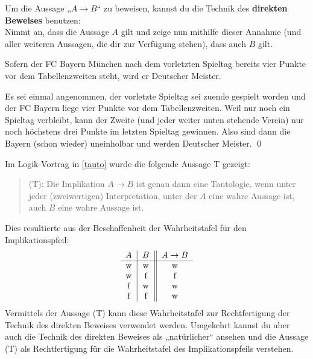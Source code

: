  
 
 \begin{axi} \label{direkterbeweis}
  Um die Aussage „$A\to B$“ zu beweisen, kannst du die Technik des \textbf{direkten Beweises} benutzen: \\
  Nimmt an, dass die Aussage $A$ gilt und zeige nun mithilfe dieser Annahme (und aller weiteren Aussagen, die dir zur Verfügung stehen), dass auch $B$ gilt. %
  \end{axi}
  \begin{bsp}
 Sofern der FC Bayern München nach dem vorletzten Spieltag bereits vier Punkte vor dem Tabellenzweiten steht, wird er Deutscher Meister.
 \end{bsp}
 \begin{bew}
Es sei einmal angenommen, der vorletzte Spieltag sei zuende gespielt worden und der FC Bayern liege vier Punkte vor dem Tabellenzweiten. Weil nur noch ein Spieltag verbleibt, kann der Zweite (und jeder weiter unten stehende Verein) nur noch höchstens drei Punkte im letzten Spieltag gewinnen. Also sind dann die Bayern (schon wieder) uneinholbar und werden Deutscher Meister. \qed
  \end{bew}
  
  \begin{bem}
 Im Logik-Vortrag in \cref{tauto} wurde die folgende Aussage T gezeigt:
 \begin{quote}
  (T): Die Implikation $A\to B$ ist genau dann eine Tautologie, wenn unter jeder (zweiwertigen) Interpretation, unter der $A$ eine wahre Aussage ist, auch $B$ eine wahre Aussage ist.
 \end{quote}
Dies resultierte aus der Beschaffenheit der Wahrheitstafel für den Implikationspfeil:
 \[ \begin{tabular}{c|c||c}
     $A$ & $B$ & $A\to B$ \\
     \hline
     w & w & w \\
     w & f & f \\
     f & w & w \\
    f & f & w
    \end{tabular} \]
Vermittels der Aussage (T) kann diese Wahrheitstafel zur Rechtfertigung der Technik des direkten Beweises verwendet werden. Umgekehrt kannst du aber auch die Technik des direkten Beweises als „natürlicher“ ansehen und die Aussage (T) als Rechtfertigung für die Wahrheitstafel des Implikationspfeils verstehen.
  \end{bem}
  
